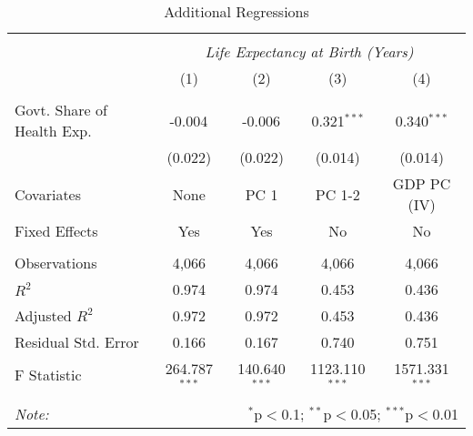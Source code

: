 \begin{table}[!htbp] \centering
  \caption{Additional Regressions \label{additional_regs}}
\begin{tabular}{@{\extracolsep{5pt}}lcccc}
\\[-1.8ex]\hline
\hline \\[-1.8ex]
& \multicolumn{4}{c}{\textit{Life Expectancy at Birth (Years)}} \
\cr \
\\[-1.8ex] & (1) & (2) & (3) & (4) \\
\hline \\[-1.8ex]
 Govt. Share of Health Exp. & -0.004$^{}$ & -0.006$^{}$ & 0.321$^{***}$ & 0.340$^{***}$ \\
  & (0.022) & (0.022) & (0.014) & (0.014) \\
 Covariates & None & PC 1 & PC 1-2 & GDP PC (IV) \\
 Fixed Effects & Yes & Yes & No & No \\
\hline \\[-1.8ex]
 Observations & 4,066 & 4,066 & 4,066 & 4,066 \\
 $R^2$ & 0.974 & 0.974 & 0.453 & 0.436 \\
 Adjusted $R^2$ & 0.972 & 0.972 & 0.453 & 0.436 \\
 Residual Std. Error & 0.166 & 0.167 & 0.740 & 0.751  \\
 F Statistic & 264.787$^{***}$  & 140.640$^{***}$  & 1123.110$^{***}$  & 1571.331$^{***}$  \\
\hline
\hline \\[-1.8ex]
\textit{Note:} & \multicolumn{4}{r}{$^{*}$p$<$0.1; $^{**}$p$<$0.05; $^{***}$p$<$0.01} \\
\end{tabular}
\end{table}